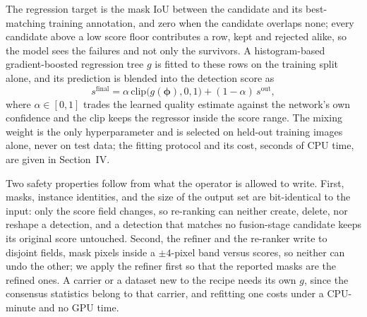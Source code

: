 The regression target is the mask IoU between the candidate and its best-matching training annotation, and zero when the candidate overlaps none; every candidate above a low score floor contributes a row, kept and rejected alike, so the model sees the failures and not only the survivors. A histogram-based gradient-boosted regression tree $g$ is fitted to these rows on the training split alone, and its prediction is blended into the detection score as
\begin{equation}\label{eq:rrblend}
s^{\mathrm{final}}=\alpha\,\mathrm{clip}\bigl(g(\boldsymbol{\phi}),0,1\bigr)+(1-\alpha)\,s^{\mathrm{out}},
\end{equation}
where $\alpha\in[0,1]$ trades the learned quality estimate against the network's own confidence and the clip keeps the regressor inside the score range. The mixing weight is the only hyperparameter and is selected on held-out training images alone, never on test data; the fitting protocol and its cost, seconds of CPU time, are given in Section~IV.

Two safety properties follow from what the operator is allowed to write. First, masks, instance identities, and the size of the output set are bit-identical to the input: only the score field changes, so re-ranking can neither create, delete, nor reshape a detection, and a detection that matches no fusion-stage candidate keeps its original score untouched. Second, the refiner and the re-ranker write to disjoint fields, mask pixels inside a $\pm 4$-pixel band versus scores, so neither can undo the other; we apply the refiner first so that the reported masks are the refined ones. A carrier or a dataset new to the recipe needs its own $g$, since the consensus statistics belong to that carrier, and refitting one costs under a CPU-minute and no GPU time.
